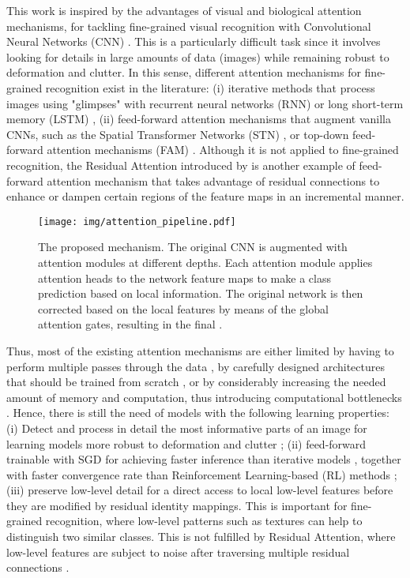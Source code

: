 \documentclass[runningheads]{llncs}
\begin{document}
This work is inspired by the advantages of visual and biological attention mechanisms, for tackling fine-grained visual recognition with Convolutional Neural Networks (CNN) \cite{lecun1998gradient}. This is a particularly difficult task since it involves looking for details in large amounts of data (images) while remaining robust to deformation and clutter. In this sense, different attention mechanisms for fine-grained recognition exist in the literature: (i) iterative methods that process images using "glimpses" with recurrent neural networks (RNN) or long short-term memory (LSTM) \cite{sermanet2014attention,zhao2017diversified}, (ii) feed-forward attention mechanisms that augment vanilla CNNs, such as the Spatial Transformer Networks (STN) \cite{jaderberg2015spatial}, or top-down feed-forward attention mechanisms (FAM) \cite{rodriguez2017age}. Although it is not applied to fine-grained recognition, the Residual Attention introduced by \cite{wang2017residual} is another example of feed-forward attention mechanism that takes advantage of residual connections \cite{he2016deep} to enhance or dampen certain regions of the feature maps in an incremental manner.


\begin{figure}[t!]
\centering 
	\texttt{[image: img/attention\_pipeline.pdf]}
\caption{The proposed mechanism. The original CNN is augmented with  attention modules at  different depths. Each attention module applies  attention heads to the network feature maps to make a class prediction based on local information. The original network  is then corrected based on the local features by means of the global attention gates, resulting in the final . }
\label{fig:overall}
\end{figure}

Thus, most of the existing attention mechanisms are either limited by having to perform multiple passes through the data \cite{sermanet2014attention}, by carefully designed architectures that should be trained from scratch \cite{jaderberg2015spatial}, or by considerably increasing the needed amount of memory and computation, thus introducing computational bottlenecks \cite{jetley2018learn}. Hence, there is still the need of models with the following learning properties: (i) Detect and process in detail the most informative parts of an image for learning models more robust to deformation and clutter \cite{mnih2014recurrent}; (ii) feed-forward trainable with SGD for achieving faster inference than iterative models \cite{sermanet2014attention,zhao2017diversified}, together with faster convergence rate than Reinforcement Learning-based (RL) methods \cite{sermanet2014attention,liu2016fully}; (iii) preserve low-level detail for a direct access to local low-level features before they are modified by residual identity mappings. This is important for fine-grained recognition, where low-level patterns such as textures can help to distinguish two similar classes. This is not fulfilled by Residual Attention, where low-level features are subject to noise after traversing multiple residual connections \cite{wang2017residual}. 
\end{document}
